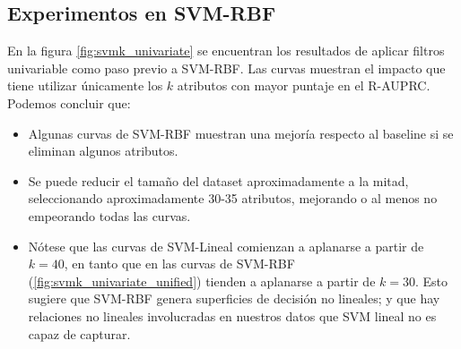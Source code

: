 \subsection{Experimentos en SVM-RBF}

En la figura \ref{fig:svmk_univariate} se encuentran los resultados de aplicar filtros univariable como paso previo a SVM-RBF. Las curvas muestran el impacto que tiene utilizar únicamente los $k$ atributos con mayor puntaje en el R-AUPRC. Podemos concluir que:

\begin{itemize}
\item Algunas curvas de SVM-RBF muestran una mejoría respecto al baseline si se eliminan algunos atributos. 
\item Se puede reducir el tamaño del dataset aproximadamente a la mitad, seleccionando aproximadamente 30-35 atributos, mejorando o al menos no empeorando todas las curvas. 
\item Nótese que las curvas de SVM-Lineal comienzan a aplanarse a partir de $k=40$, en tanto que en las curvas de SVM-RBF (\ref{fig:svmk_univariate_unified}) tienden a aplanarse a partir de $k=30$. Esto sugiere que SVM-RBF genera superficies de decisión no lineales; y que hay relaciones no lineales involucradas en nuestros datos que SVM lineal no es capaz de capturar.
\end{itemize}

